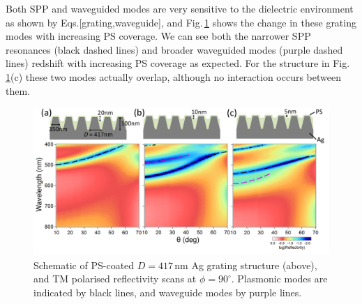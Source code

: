 Both SPP and waveguided modes are very sensitive to the dielectric environment as shown by Eqs.[grating,waveguide], and Fig.\,\ref{7Fig13} shows the change in these grating modes with increasing PS coverage. We can see both the narrower SPP resonances (black dashed lines) and broader waveguided modes (purple dashed lines) redshift with increasing PS coverage as expected. For the structure in Fig.\,\ref{7Fig13}(c) these two modes actually overlap, although no interaction occurs between them.
\begin{figure}[ht] 
\centering    
\includegraphics[width=\textwidth]{Fig13}
\caption{Schematic of PS-coated $D=417$\,nm Ag grating structure (above), and TM polarised reflectivity scans at $\phi=90^{\circ}$. Plasmonic modes are indicated by black lines, and waveguide modes by purple lines.}
\label{7Fig13}
\end{figure}

